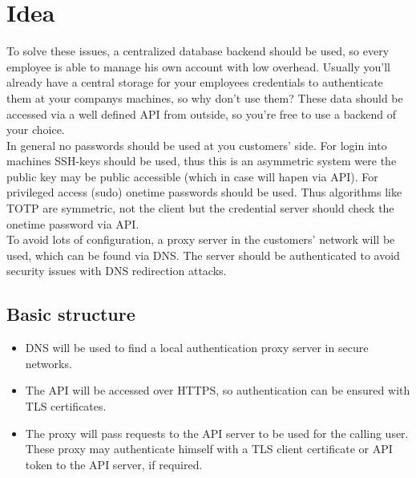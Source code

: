 %
%
%
%
%
%
%


\section{Idea}

To solve these issues, a centralized database backend should be used, so every
employee is able to manage his own account with low overhead. Usually you'll
already have a central storage for your employees credentials to authenticate
them at your companys machines, so why don't use them? These data should be
accessed via a well defined API from outside, so you're free to use a backend of
your choice. \\

In general no passwords should be used at you customers' side. For login into
machines SSH-keys should be used, thus this is an asymmetric system were the
public key may be public accessible (which in case will hapen via API). For
privileged access (sudo) onetime passwords should be used. Thus algorithms like
TOTP are symmetric, not the client but the credential server should check the
onetime password via API. \\

To avoid lots of configuration, a proxy server in the customers' network will be
used, which can be found via DNS. The server should be authenticated to avoid
security issues with DNS redirection attacks.


\subsection{Basic structure}

\begin{itemize}
	\item DNS will be used to find a local authentication proxy server in secure
		networks.
	\item The API will be accessed over HTTPS, so authentication can be
		ensured with TLS certificates.
	\item The proxy will pass requests to the API server to be used for the
		calling user. These proxy may authenticate himself with a TLS client
		certificate or API token to the API server, if required.
\end{itemize}

